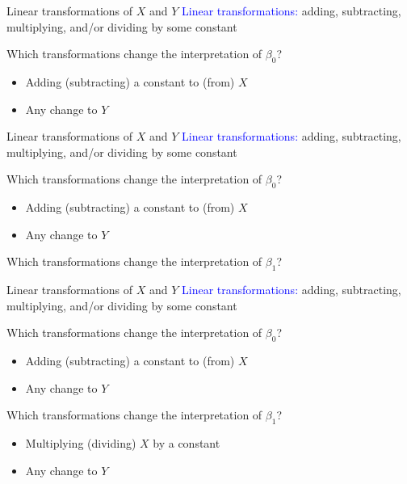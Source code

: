 \documentclass[10pt,t]{beamer}
\begin{document}
\begin{frame}{Linear transformations of $X$ and $Y$}
\textcolor{blue}{Linear transformations:} adding, subtracting, multiplying, and/or dividing by some constant

\vspace{0.3cm}

Which transformations change the interpretation of $\beta_0$?
\begin{itemize}
	\item[] Adding (subtracting) a constant to (from) $X$
	\item[] Any change to $Y$ 
\end{itemize}

\end{frame}

\begin{frame}{Linear transformations of $X$ and $Y$}
\textcolor{blue}{Linear transformations:} adding, subtracting, multiplying, and/or dividing by some constant

\vspace{0.3cm}

Which transformations change the interpretation of $\beta_0$?
\begin{itemize}
	\item[] Adding (subtracting) a constant to (from) $X$
	\item[] Any change to $Y$ 
\end{itemize}

\vspace{0.3cm}

Which transformations change the interpretation of $\beta_1$?

\end{frame}

\begin{frame}{Linear transformations of $X$ and $Y$}
\textcolor{blue}{Linear transformations:} adding, subtracting, multiplying, and/or dividing by some constant

\vspace{0.3cm}

Which transformations change the interpretation of $\beta_0$?
\begin{itemize}
	\item[] Adding (subtracting) a constant to (from) $X$
	\item[] Any change to $Y$ 
\end{itemize}

\vspace{0.3cm}

Which transformations change the interpretation of $\beta_1$?
\begin{itemize}
	\item[] Multiplying (dividing) $X$ by a constant
	\item[] Any change to $Y$ 
\end{itemize}
\end{frame}
\end{document}
